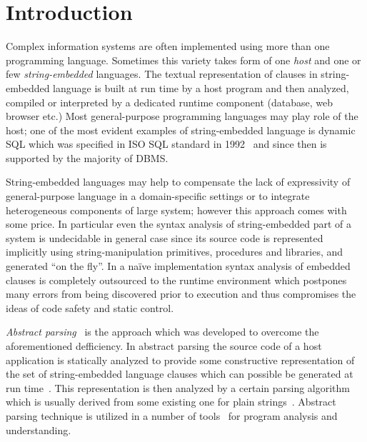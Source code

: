 \section{Introduction}

Complex information systems are often implemented using more than one programming language. 
Sometimes this variety takes form of one \emph{host} and one or few \emph{string-embedded}
languages. The textual representation of clauses in string-embedded language is built at 
run time by a host program and then analyzed, compiled or interpreted by a dedicated 
runtime component (database, web browser etc.) Most general-purpose programming languages 
may play role of the host; one of the most evident examples of string-embedded language is 
dynamic SQL which was specified in ISO SQL standard in 1992~\cite{ISO} and since then is 
supported by the majority of DBMS. 



String-embedded languages may help to compensate the lack of expressivity of general-purpose
language in a domain-specific settings or to integrate heterogeneous components of large system;
however this approach comes with some price. In particular even the syntax analysis of 
string-embedded part of a system is undecidable in general case since its source code
is represented implicitly using string-manipulation primitives, procedures and libraries, and
generated ``on the fly''. In a na\"ive implementation syntax analysis of embedded clauses is
completely outsourced to the runtime environment which postpones many errors from being 
discovered prior to execution and thus compromises the ideas of code safety and static control.

\emph{Abstract parsing}~\cite{AbstrParsing} is the approach which was developed to overcome the 
aforementioned defficiency. In abstract parsing the source code of a host application is statically 
analyzed to provide some constructive representation of the set of string-embedded language clauses which
can possible be generated at run time~\cite{StringExpr,SAofStrVal}. This representation is then analyzed 
by a certain parsing algorithm which is usually derived from some existing one for plain strings~\cite{Grune}.
Abstract parsing technique is utilized in a number of tools~\cite{JSA,PHPSA,ALVOR1,ALVOR2} for
program analysis and understanding.

